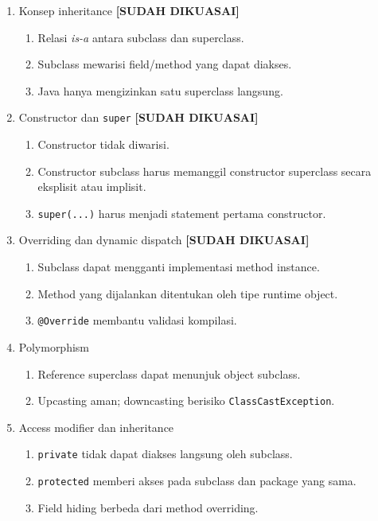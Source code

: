 \begin{enumerate}
    \item Konsep inheritance \textbf{[SUDAH DIKUASAI]}
    \begin{enumerate}
        \item Relasi \textit{is-a} antara subclass dan superclass.
        \item Subclass mewarisi field/method yang dapat diakses.
        \item Java hanya mengizinkan satu superclass langsung.
    \end{enumerate}
    \item Constructor dan \texttt{super} \textbf{[SUDAH DIKUASAI]}
    \begin{enumerate}
        \item Constructor tidak diwarisi.
        \item Constructor subclass harus memanggil constructor superclass secara eksplisit atau implisit.
        \item \texttt{super(...)} harus menjadi statement pertama constructor.
    \end{enumerate}
    \item Overriding dan dynamic dispatch \textbf{[SUDAH DIKUASAI]}
    \begin{enumerate}
        \item Subclass dapat mengganti implementasi method instance.
        \item Method yang dijalankan ditentukan oleh tipe runtime object.
        \item \texttt{@Override} membantu validasi kompilasi.
    \end{enumerate}
    \item Polymorphism
    \begin{enumerate}
        \item Reference superclass dapat menunjuk object subclass.
        \item Upcasting aman; downcasting berisiko \texttt{ClassCastException}.
    \end{enumerate}
    \item Access modifier dan inheritance
    \begin{enumerate}
        \item \texttt{private} tidak dapat diakses langsung oleh subclass.
        \item \texttt{protected} memberi akses pada subclass dan package yang sama.
        \item Field hiding berbeda dari method overriding.

\end{enumerate}
\end{enumerate}
